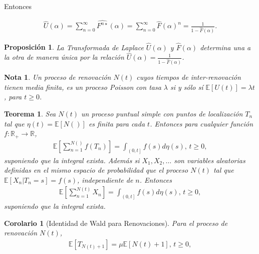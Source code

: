 \documentclass{article}
\newtheorem{Teo}{Teorema}
\newtheorem{Note}{Nota}
\newtheorem{Prop}{Proposición}
\newtheorem{Coro}{Corolario}
\newcommand{\rea}{\mathbb{R}}
\newcommand{\esp}{\mathbb{E}}
\begin{document}
Entonces

\begin{eqnarray*}
\hat{U}\left(\alpha\right)=\sum_{n=0}^{\infty}\hat{F^{n\star}}\left(\alpha\right)=\sum_{n=0}^{\infty}\hat{F}\left(\alpha\right)^{n}=\frac{1}{1-\hat{F}\left(\alpha\right)}.
\end{eqnarray*}


\begin{Prop}
La Transformada de Laplace $\hat{U}\left(\alpha\right)$ y $\hat{F}\left(\alpha\right)$ determina una a la otra de manera \'unica por la relaci\'on $\hat{U}\left(\alpha\right)=\frac{1}{1-\hat{F}\left(\alpha\right)}$.
\end{Prop}


\begin{Note}
Un proceso de renovaci\'on $N\left(t\right)$ cuyos tiempos de inter-renovaci\'on tienen media finita, es un proceso Poisson con tasa $\lambda$ si y s\'olo s\'i $\esp\left[U\left(t\right)\right]=\lambda t$, para $t\geq0$.
\end{Note}


\begin{Teo}
Sea $N\left(t\right)$ un proceso puntual simple con puntos de localizaci\'on $T_{n}$ tal que $\eta\left(t\right)=\esp\left[N\left(\right)\right]$ es finita para cada $t$. Entonces para cualquier funci\'on $f:\rea_{+}\rightarrow\rea$,
\begin{eqnarray*}
\esp\left[\sum_{n=1}^{N\left(\right)}f\left(T_{n}\right)\right]=\int_{\left(0,t\right]}f\left(s\right)d\eta\left(s\right)\textrm{,  }t\geq0,
\end{eqnarray*}
suponiendo que la integral exista. Adem\'as si $X_{1},X_{2},\ldots$ son variables aleatorias definidas en el mismo espacio de probabilidad que el proceso $N\left(t\right)$ tal que $\esp\left[X_{n}|T_{n}=s\right]=f\left(s\right)$, independiente de $n$. Entonces
\begin{eqnarray*}
\esp\left[\sum_{n=1}^{N\left(t\right)}X_{n}\right]=\int_{\left(0,t\right]}f\left(s\right)d\eta\left(s\right)\textrm{,  }t\geq0,
\end{eqnarray*} 
suponiendo que la integral exista. 
\end{Teo}

\begin{Coro}[Identidad de Wald para Renovaciones]
Para el proceso de renovaci\'on $N\left(t\right)$,
\begin{eqnarray*}
\esp\left[T_{N\left(t\right)+1}\right]=\mu\esp\left[N\left(t\right)+1\right]\textrm{,  }t\geq0,
\end{eqnarray*}  
\end{Coro}
\end{document}
